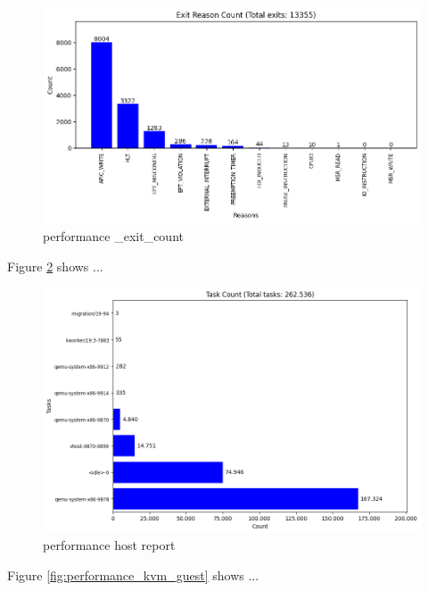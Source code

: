 \documentclass[MMR,Master,english]{twbook}
\begin{document}
\begin{figure}[H]
	\centering
	\includegraphics[width=1.0\columnwidth]{img/performance/kvm_exit_count.png}
	\caption[performance \_exit\_count]{performance \_exit\_count}
	\label{fig:performance_kvm_exit}
\end{figure}
\clearpage


Figure \ref{fig:performance_kvm_host} shows ...

\begin{figure}[H]
	\centering
	\includegraphics[width=1.0\columnwidth]{img/performance/results_host_report.png}
	\caption[performance host report]{performance host report}
	\label{fig:performance_kvm_host}
\end{figure}
\clearpage

Figure \ref{fig:performance_kvm_guest} shows ...
\end{document}
